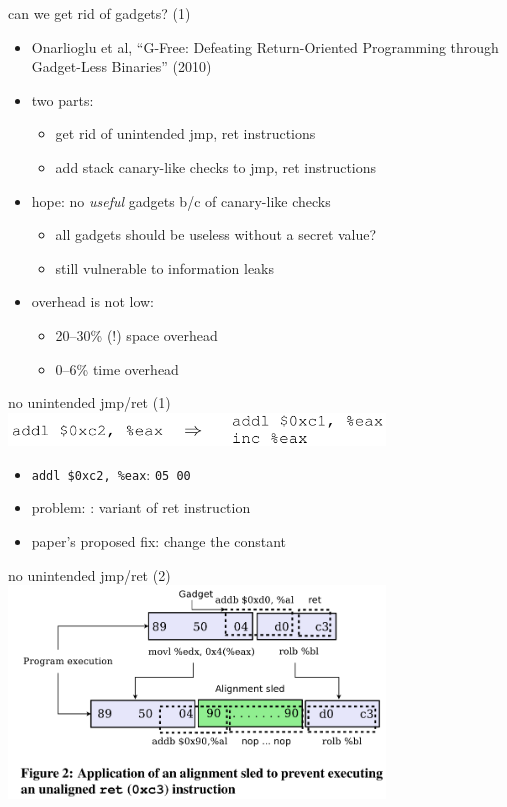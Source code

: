 \begin{frame}{can we get rid of gadgets? (1)}
    \begin{itemize}
    \item Onarlioglu et al, ``G-Free: Defeating Return-Oriented Programming through Gadget-Less Binaries'' (2010)
    \item two parts:
        \begin{itemize}
        \item get rid of unintended jmp, ret instructions
        \item add stack canary-like checks to jmp, ret instructions
        \end{itemize}
    \item hope: no \textit{useful} gadgets b/c of canary-like checks
        \begin{itemize}
        \item all gadgets should be useless without a secret value?
        \item still vulnerable to information leaks
        \end{itemize}
    \item overhead is not low:
        \begin{itemize}
        \item 20--30\% (!) space overhead
        \item 0--6\% time overhead
        \end{itemize}
    \end{itemize}
\end{frame}

\begin{frame}{no unintended jmp/ret (1)}
\includegraphics[width=10cm]{../mitigate/gfree1}
\begin{itemize}
\item \texttt{addl \$0xc2, \%eax}: \texttt{05 \myemph<2>{c2 00 00} 00}
\item problem: \texttt{}: variant of ret instruction
\item paper's proposed fix: change the constant
\end{itemize}
\end{frame}

\begin{frame}{no unintended jmp/ret (2)}
\includegraphics[width=10cm]{../mitigate/gfree2}
\end{frame}
